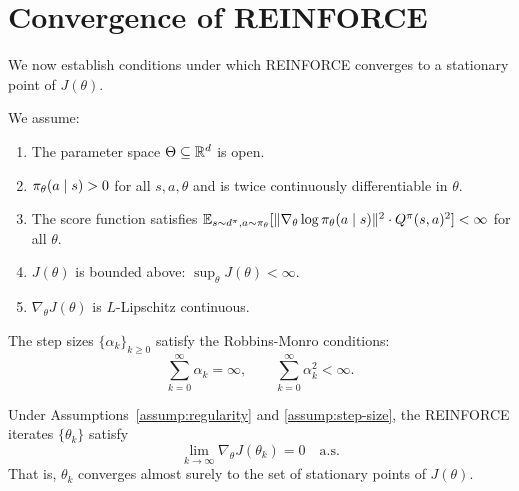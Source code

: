 \documentclass[11pt,a4paper]{article}
\begin{document}
\section{Convergence of REINFORCE}

We now establish conditions under which REINFORCE converges to a
stationary point of $J(\theta)$.

\begin{assumption}
\label{assump:regularity}
We assume:
\begin{enumerate}[label=(\roman*)]
  \item The parameter space $\Theta \subseteq \mathbb{R}^d$ is open.
  \item $\pi_\theta(a \mid s) > 0$ for all $s, a, \theta$ and is
    twice continuously differentiable in $\theta$.
  \item The score function satisfies
    $\mathbb{E}_{s \sim d^\pi, a \sim \pi_\theta}
    [\|\nabla_\theta \log \pi_\theta(a \mid s)\|^2 \cdot
    Q^{\pi}(s,a)^2] < \infty$ for all $\theta$.
  \item $J(\theta)$ is bounded above:
    $\sup_\theta J(\theta) < \infty$.
  \item $\nabla_\theta J(\theta)$ is $L$-Lipschitz continuous.
\end{enumerate}
\end{assumption}

\begin{assumption}
\label{assump:step-size}
The step sizes $\{\alpha_k\}_{k \geq 0}$ satisfy the Robbins-Monro
conditions:
\[
  \sum_{k=0}^{\infty} \alpha_k = \infty, \qquad
  \sum_{k=0}^{\infty} \alpha_k^2 < \infty.
\]
\end{assumption}

\begin{theorem}
\label{thm:convergence}
Under Assumptions~\ref{assump:regularity} and \ref{assump:step-size},
the REINFORCE iterates $\{\theta_k\}$ satisfy
\[
  \lim_{k \to \infty} \nabla_\theta J(\theta_k) = 0 \quad \text{a.s.}
\]
That is, $\theta_k$ converges almost surely to the set of stationary
points of $J(\theta)$.
\end{theorem}
\end{document}
